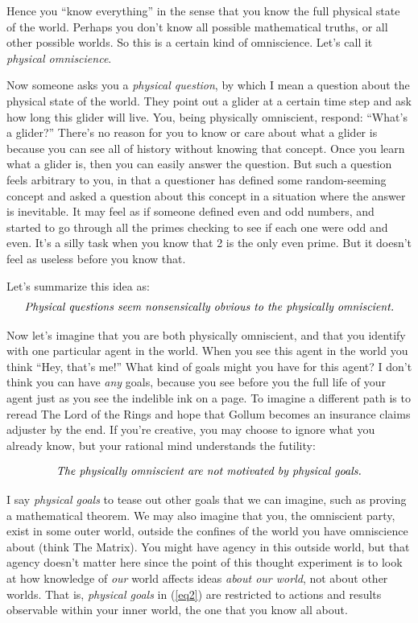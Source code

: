 \documentclass[9pt, twoside]{book}
\theoremstyle{argtstyle}
\begin{document}
Hence you ``know everything'' in the sense that you know the full physical state
of the world. Perhaps you don't know all possible mathematical truths, or all
other possible worlds. So this is a certain kind of omniscience. Let's call it
{\em physical omniscience}.

Now someone asks you a {\em physical question}, by which I mean
a question about the physical state of the world.
They point out a glider at a certain time step and
ask how long this glider will live. You, being physically omniscient,
respond:
``What's a glider?'' There's no reason for you to know or care about what a
glider is because you can see all of history without knowing that concept.
Once you
learn what a glider is, then you can easily answer the question. But such a
question feels arbitrary to you, in that a questioner has defined some
random-seeming concept and asked a question about this concept in a situation
where
the answer is inevitable. It may feel as if someone defined even and odd
numbers, and started to go through all the primes checking to see if each one
were odd and even. It's a silly task when you know that 2 is the only
even prime. But it doesn't feel as useless before you know that.

Let's summarize this idea as:
\begin{equation*}\label{eq1}
    \text{\em Physical questions seem nonsensically obvious to the physically
    omniscient.}
\end{equation*}

Now let's imagine that you are both physically omniscient, and that you identify
with one particular agent in the world.
When you see this agent in the world you
think ``Hey, that's me!'' What kind of goals might you have for this agent? I
don't think you can have {\em any} goals, because you see before you the
full life of your agent just as you see the indelible ink on a page. To imagine
a different path is to reread The Lord of the Rings and hope that Gollum
becomes an insurance claims adjuster by the end. If you're creative, you may
choose to ignore what you already know, but your rational mind understands the
futility:

\begin{equation}\label{eq2}
    \text{\em The physically omniscient are not motivated by
    physical goals.}
\end{equation}
 
I say {\em physical goals} to tease out other goals that we can imagine, such as
proving a mathematical theorem. We may also imagine that you, the omniscient
party, exist in some outer world, outside the confines of the world you have
omniscience about (think The Matrix).
You might have agency in this outside world, but that agency doesn't matter here
since the point of this thought
experiment is to look at how knowledge of {\em our} world affects ideas {\em
about our world}, not about other worlds.
That is, {\em physical goals} in (\ref{eq2})
are restricted to actions and results observable
within your inner world, the one that you know all about.
\end{document}
